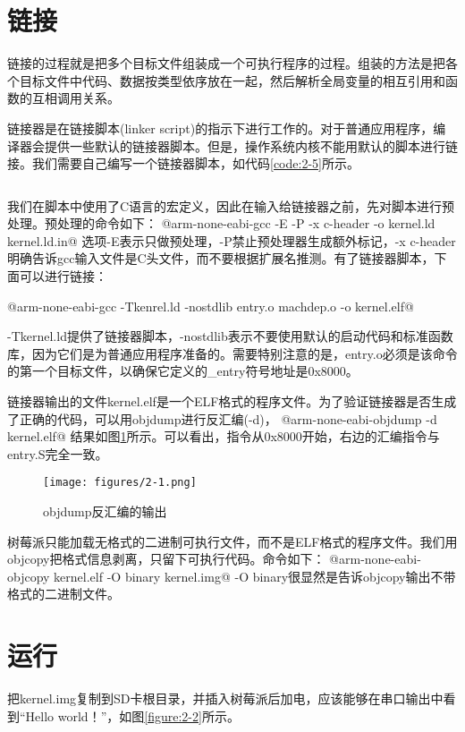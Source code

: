 \documentclass[main.tex]{subfiles}
\begin{document}
\begin{CJK*}{UTF8}{song}
\section{链接}
链接的过程就是把多个目标文件组装成一个可执行程序的过程。组装的方法是把各个目标文件中代码、数据按类型依序放在一起，然后解析全局变量的相互引用和函数的互相调用关系。
\par
链接器是在链接脚本(linker script)的指示下进行工作的。对于普通应用程序，编译器会提供一些默认的链接器脚本。但是，操作系统内核不能用默认的脚本进行链接。我们需要自己编写一个链接器脚本，如代码\ref{code:2-5}所示。

\begin{code}
\label{code:2-5}
\inputminted[linenos,numbersep=5pt,frame=lines,framesep=2mm]{c}{src/chapter02/kernel/kernel.ld.in}
\end{code}


我们在脚本中使用了C语言的宏定义，因此在输入给链接器之前，先对脚本进行预处理。预处理的命令如下：
@arm-none-eabi-gcc -E -P -x c-header -o kernel.ld kernel.ld.in@
\noindent
选项-E表示只做预处理，-P禁止预处理器生成额外标记，-x c-header明确告诉gcc输入文件是C头文件，而不要根据扩展名推测。有了链接器脚本，下面可以进行链接：

@arm-none-eabi-gcc -Tkenrel.ld -nostdlib entry.o machdep.o -o kernel.elf@

\noindent
-Tkernel.ld提供了链接器脚本，-nostdlib表示不要使用默认的启动代码和标准函数库，因为它们是为普通应用程序准备的。需要特别注意的是，entry.o必须是该命令的第一个目标文件，以确保它定义的\_entry符号地址是0x8000。
\par
链接器输出的文件kernel.elf是一个ELF格式的程序文件。为了验证链接器是否生成了正确的代码，可以用objdump进行反汇编(-d)，
@arm-none-eabi-objdump -d kernel.elf@
\noindent
结果如图\ref{figure:2-1}所示。可以看出，指令从0x8000开始，右边的汇编指令与entry.S完全一致。

\begin{figure}[htp]
\centering
\texttt{[image: figures/2-1.png]}
\caption{objdump反汇编的输出}
\label{figure:2-1}
\end{figure}

树莓派只能加载无格式的二进制可执行文件，而不是ELF格式的程序文件。我们用objcopy把格式信息剥离，只留下可执行代码。命令如下：
@arm-none-eabi-objcopy kernel.elf -O binary kernel.img@
\noindent
-O binary很显然是告诉objcopy输出不带格式的二进制文件。
\section{运行}
把kernel.img复制到SD卡根目录，并插入树莓派后加电，应该能够在串口输出中看到“Hello world！”，如图\ref{figure:2-2}所示。


\end{CJK*}
\end{document}
